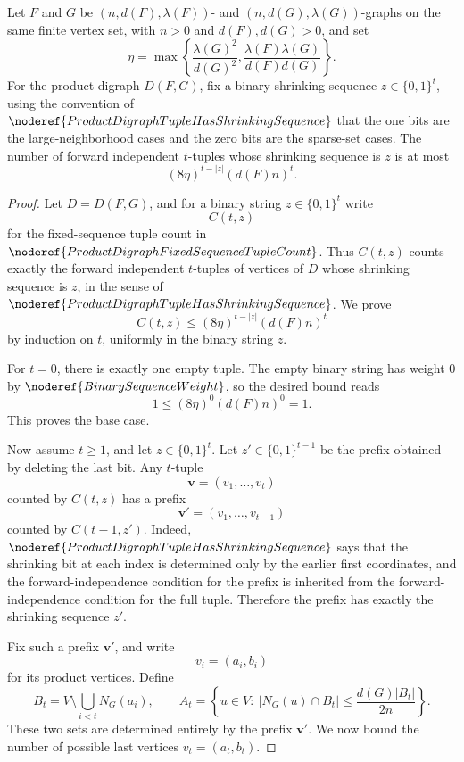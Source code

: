 \begin{lemma}
Let \(F\) and \(G\) be \((n,d(F),\lambda(F))\)- and \((n,d(G),\lambda(G))\)-graphs on the same finite vertex set, with \(n>0\) and \(d(F),d(G)>0\), and set
\[
  \eta=\max\left\{\frac{\lambda(G)^2}{d(G)^2},
  \frac{\lambda(F)\lambda(G)}{d(F)d(G)}\right\}.
\]
For the product digraph \(D(F,G)\), fix a binary shrinking sequence \(z\in\{0,1\}^t\), using the convention of \(\noderef{ProductDigraphTupleHasShrinkingSequence}\) that the one bits are the large-neighborhood cases and the zero bits are the sparse-set cases. The number of forward independent \(t\)-tuples whose shrinking sequence is \(z\) is at most
\[
  (8\eta)^{t-|z|}(d(F)n)^t.
\]
\end{lemma}
\begin{proof}
Let \(D=D(F,G)\), and for a binary string \(z\in\{0,1\}^t\) write
\[
  C(t,z)
\]
for the fixed-sequence tuple count in \(\noderef{ProductDigraphFixedSequenceTupleCount}\). Thus \(C(t,z)\) counts exactly the forward independent \(t\)-tuples of vertices of \(D\) whose shrinking sequence is \(z\), in the sense of \(\noderef{ProductDigraphTupleHasShrinkingSequence}\). We prove
\[
  C(t,z)\le (8\eta)^{t-|z|}(d(F)n)^t
\]
by induction on \(t\), uniformly in the binary string \(z\).

For \(t=0\), there is exactly one empty tuple. The empty binary string has weight \(0\) by \(\noderef{BinarySequenceWeight}\), so the desired bound reads
\[
  1\le (8\eta)^0(d(F)n)^0=1.
\]
This proves the base case.

Now assume \(t\ge 1\), and let \(z\in\{0,1\}^t\). Let \(z'\in\{0,1\}^{t-1}\) be the prefix obtained by deleting the last bit. Any \(t\)-tuple
\[
  \mathbf v=(v_1,\ldots,v_t)
\]
counted by \(C(t,z)\) has a prefix
\[
  \mathbf v'=(v_1,\ldots,v_{t-1})
\]
counted by \(C(t-1,z')\). Indeed, \(\noderef{ProductDigraphTupleHasShrinkingSequence}\) says that the shrinking bit at each index is determined only by the earlier first coordinates, and the forward-independence condition for the prefix is inherited from the forward-independence condition for the full tuple. Therefore the prefix has exactly the shrinking sequence \(z'\).

Fix such a prefix \(\mathbf v'\), and write
\[
  v_i=(a_i,b_i)
\]
for its product vertices. Define
\[
  B_t=V\setminus\bigcup_{i<t}N_G(a_i),
  \qquad
  A_t=\left\{u\in V:\ |N_G(u)\cap B_t|
      \le \frac{d(G)|B_t|}{2n}\right\}.
\]
These two sets are determined entirely by the prefix \(\mathbf v'\). We now bound the number of possible last vertices \(v_t=(a_t,b_t)\).


\end{proof}
